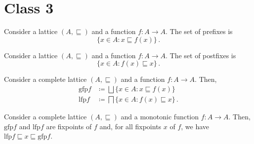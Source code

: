 {{%

\newcommand{\NN}{\mathbb{N}}
\renewcommand{\implies}{\Rightarrow}
\newcommand{\implied}{\Leftarrow}
\newcommand{\eps}{\varepsilon}
\newcommand{\gfp}{\mathrm{gfp}}
\newcommand{\lfp}{\mathrm{lfp}}
\newcommand{\defas}{\coloneqq}
\renewcommand{\le}{\sqsubseteq}
\renewcommand{\ge}{\sqsupseteq}
\renewcommand{\sqcap}{\bigsqcap}
\renewcommand{\sqcup}{\bigsqcup}
\newcommand{\bottom}{\perp}


\newcommand{\Theorem}[2][]{\begin{theorem}[#1]#2\end{theorem}}
\newcommand{\Definition}[2][]{\begin{definition}[#1]#2\end{definition}}
\newcommand{\Example}[2][]{\begin{example}[#1]#2\end{example}}
\newcommand{\Homework}[2][]{\begin{homework}[#1]#2\end{homework}}
\newcommand{\Lemma}[2][]{\begin{lemma}[#1]#2\end{lemma}}


\chapter{Class 3}

	

\Definition[Prefixpoint]{
	Consider a lattice $(A, \le)$ and a function $f \colon A \to A$. 
	The set of prefixes is
	\[
		\{ x \in A : x \le f(x) \} \,.
	\] 
}

\Definition[Postfixpoint]{
	Consider a lattice $(A, \le)$ and a function $f \colon A \to A$. 
	The set of postfixes is
	\[
		\{ x \in A : f(x) \le x \} \,.
	\] 
}

\Definition[$\gfp$ and $\lfp$]{
	Consider a complete lattice $(A, \le)$ and a function $f \colon A \to A$. 
	Then, 
	\begin{align*}
		\gfp f &\defas \sqcup \{ x \in A : x \le f(x) \} \\
		\lfp f &\defas \sqcap \{ x \in A : f(x) \le x \} \,.
	\end{align*}
}

\Theorem[Fixpoints] {
	Consider a complete lattice $(A, \le)$ and a monotonic function $f \colon A \to A$.
	Then, $\gfp f$ and $\lfp f$ are fixpoints of $f$ and, for all fixpoints $x$ of $f$, we have $\lfp f \le x \le \gfp f$.
}


}}
